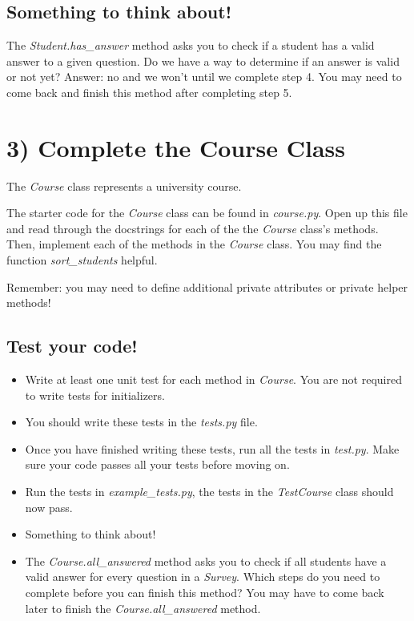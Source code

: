 \documentclass[12pt]{article}
\begin{document}
\bigskip

\subsection*{Something to think about!}
The \textit{Student.has\_answer} method asks you to check if a student has a
valid answer to a given question. Do we have a way to determine if an answer is
valid or not yet? Answer: no and we won’t until we complete step 4. You may need
to come back and finish this method after completing step 5.

\section*{3) Complete the Course Class}
The \textit{Course} class represents a university course.

\bigskip

\noindent The starter code for the \textit{Course} class can be found in \textit{course.py}. Open up this
file and read through the docstrings for each of the the \textit{Course} class’s methods.
Then, implement each of the methods in the \textit{Course} class. You may find the
function \textit{sort\_students} helpful.

\bigskip

\noindent Remember: you may need to define additional private attributes or
private helper methods!

\subsection*{Test your code!}
\begin{itemize}
    \item Write at least one unit test for each method in \textit{Course}. You are not
    required to write tests for initializers.
    \item You should write these tests in the \textit{tests.py} file.
    \item Once you have finished writing these tests, run all the tests in
    \textit{test.py}. Make sure your code passes all your tests before moving on.
    \item Run the tests in \textit{example\_tests.py}, the tests in the \textit{TestCourse} class
    should now pass.
    \item Something to think about!
    \item The \textit{Course.all\_answered} method asks you to check if all students have
    a valid answer for every question in a \textit{Survey}. Which steps do you need to
    complete before you can finish this method? You may have to come back later to
    finish the \textit{Course.all\_answered} method.
\end{itemize}
\end{document}
